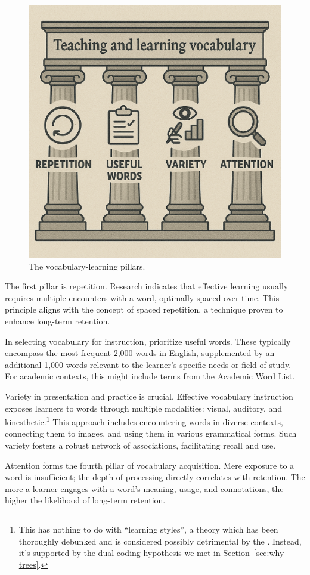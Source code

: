 \begin{figure}
    \centering
    \includegraphics[width=0.5\linewidth]{figures/ChatGPT Image Apr 30, 2025, 11_26_32 AM.png}
    \caption{The vocabulary-learning pillars.}
    \label{fig:vocab-pillars-AI}
\end{figure}

The first pillar is repetition. Research indicates that effective learning usually requires multiple encounters with a word, optimally spaced over time. This principle aligns with the concept of spaced repetition, a technique proven to enhance long-term retention.

In selecting vocabulary for instruction, prioritize useful words. These typically encompass the most frequent 2,000 words in English, supplemented by an additional 1,000 words relevant to the learner's specific needs or field of study. For academic contexts, this might include terms from the Academic Word List.

Variety in presentation and practice is crucial. Effective vocabulary instruction exposes learners to words through multiple modalities: visual, auditory, and kinesthetic.\footnote{This has nothing to do with ``learning styles'', a theory which has been thoroughly debunked and is considered possibly detrimental by the \citet{apa2019learning}. Instead, it's supported by the dual-coding hypothesis \citep{ginns2005} we met in Section~\ref{sec:why-trees}.} This approach includes encountering words in diverse contexts, connecting them to images, and using them in various grammatical forms. Such variety fosters a robust network of associations, facilitating recall and use.

Attention forms the fourth pillar of vocabulary acquisition. Mere exposure to a word is insufficient; the depth of processing directly correlates with retention. The more a learner engages with a word's meaning, usage, and connotations, the higher the likelihood of long-term retention.

